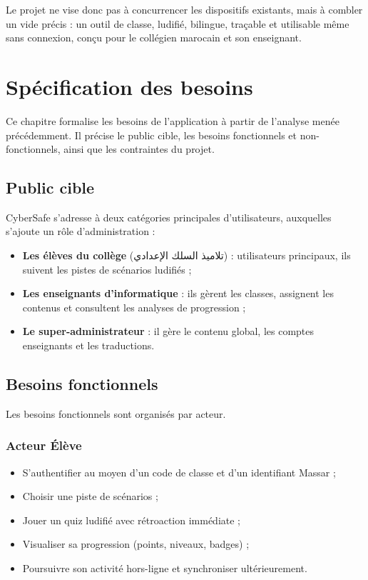 \documentclass[12pt, a4paper, oneside]{report}
\begin{document}
Le projet ne vise donc pas à concurrencer les dispositifs existants, mais à combler un vide précis : un outil de classe, ludifié, bilingue, traçable et utilisable même sans connexion, conçu pour le collégien marocain et son enseignant.

\chapter{Spécification des besoins}

Ce chapitre formalise les besoins de l'application à partir de l'analyse menée précédemment. Il précise le public cible, les besoins fonctionnels et non-fonctionnels, ainsi que les contraintes du projet.

\section{Public cible}
CyberSafe s'adresse à deux catégories principales d'utilisateurs, auxquelles s'ajoute un rôle d'administration :
\begin{itemize}[leftmargin=*]
  \item \textbf{Les élèves du collège} (\textarabic{تلاميذ السلك الإعدادي}) : utilisateurs principaux, ils suivent les pistes de scénarios ludifiés ;
  \item \textbf{Les enseignants d'informatique} : ils gèrent les classes, assignent les contenus et consultent les analyses de progression ;
  \item \textbf{Le super-administrateur} : il gère le contenu global, les comptes enseignants et les traductions.
\end{itemize}

\section{Besoins fonctionnels}
Les besoins fonctionnels sont organisés par acteur.

\subsection{Acteur Élève}
\begin{itemize}[leftmargin=*]
  \item S'authentifier au moyen d'un code de classe et d'un identifiant Massar ;
  \item Choisir une piste de scénarios ;
  \item Jouer un quiz ludifié avec rétroaction immédiate ;
  \item Visualiser sa progression (points, niveaux, badges) ;
  \item Poursuivre son activité hors-ligne et synchroniser ultérieurement.
\end{itemize}
\end{document}

